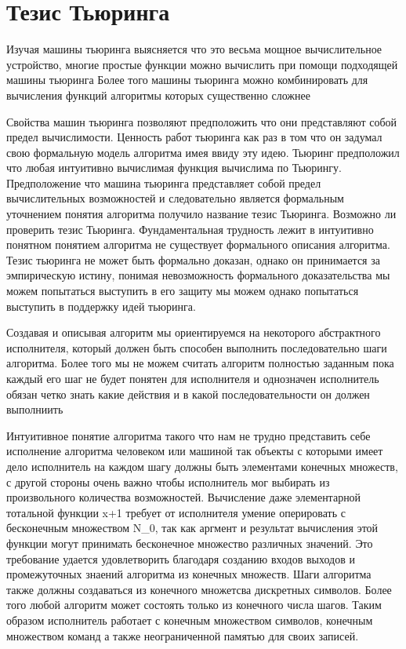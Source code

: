 \section{Тезис Тьюринга}
Изучая машины тьюринга выясняется что это весьма мощное вычислительное устройство, многие простые функции можно вычислить при помощи подходящей машины тьюринга
Более того машины тьюринга можно комбинировать для вычисления функций алгоритмы которых существенно сложнее

Свойства машин тьюринга позволяют предположить что они представляют собой предел вычислимости. Ценность работ тьюринга как раз в том что он задумал свою формальную модель алгоритма имея ввиду эту идею. Тьюринг предположил что любая интуитивно вычислимая функция вычислима по Тьюрингу. Предположение что машина тьюринга представляет собой предел вычислительных возможностей и следовательно является формальным уточнением понятия алгоритма получило название тезис Тьюринга. Возможно ли проверить тезис Тьюринга. Фундаментальная трудность лежит в интуитивно понятном понятием алгоритма не существует формального описания алгоритма. Тезис тьюринга не может быть формально доказан, однако он принимается за эмпирическую истину, понимая невозможность формального доказательства мы можем попытаться выступить в его защиту мы можем однако попытаться выступить в поддержку идей тьюринга.

Создавая и описывая алгоритм мы ориентируемся на некоторого абстрактного исполнителя, который должен быть способен выполнить последовательно шаги алгоритма. Более того мы не можем считать алгоритм полностью заданным пока каждый его шаг не будет понятен для исполнителя и однозначен исполнитель обязан четко знать какие действия и в какой последовательности он должен выполниить

Интуитивное понятие алгоритма такого что нам не трудно представить себе исполнение алгоритма человеком или машиной так объекты с которыми имеет дело исполнитель на каждом шагу должны быть элементами конечных множеств, с другой стороны очень важно чтобы исполнитель мог выбирать из произвольного количества возможностей. Вычисление даже элементарной тотальной функции x+1 требует от исполнителя умение оперировать с бесконечным множеством N_0, так как аргмент и результат вычисления этой функции могут принимать бесконечное множество различных значений. Это требование удается удовлетворить благодаря созданию входов выходов и промежуточных знаений алгоритма из конечных множеств. Шаги алгоритма также должны создаваться из конечного множетсва дискретных символов. Более того любой алгоритм может состоять только из конечного числа шагов. Таким образом исполнитель работает с конечным множеством символов, конечным множеством команд а также неограниченной памятью для своих записей.

